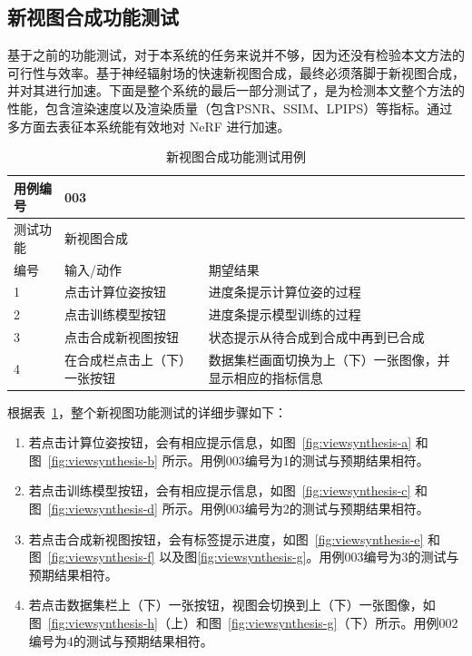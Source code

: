 \subsection{新视图合成功能测试}
基于之前的功能测试，对于本系统的任务来说并不够，因为还没有检验本文方法的可行性与效率。基于神经辐射场的快速新视图合成，最终必须落脚于新视图合成，并对其进行加速。下面是整个系统的最后一部分测试了，是为检测本文整个方法的性能，包含渲染速度以及渲染质量（包含PSNR、SSIM、LPIPS）等指标。通过多方面去表征本系统能有效地对 NeRF 进行加速。
\begin{table}[htbp]
  \centering
  \small{}\setlength{}
  \caption{新视图合成功能测试用例}
  \begin{tabular}{|p{2cm}<{\centering}|p{4cm}<{\centering}|p{4cm}<{\centering}|}
    \hline
    用例编号 & \multicolumn{2}{|l|}{003}       \\
    \hline
    测试功能 & \multicolumn{2}{|l|}{新视图合成}       \\
    \hline
    编号 & 输入/动作 & 期望结果 \\
    \hline
    1 & 点击计算位姿按钮 &  进度条提示计算位姿的过程 \\
    \hline
    2 & 点击训练模型按钮 &  进度条提示模型训练的过程 \\
    \hline
    3 & 点击合成新视图按钮 & 状态提示从待合成到合成中再到已合成 \\
    \hline
    4 & 在合成栏点击上（下）一张按钮 & 数据集栏画面切换为上（下）一张图像，并显示相应的指标信息 \\
    \hline
  \end{tabular}
  \label{tab:viewsynthesis}
\end{table}
根据表~\ref{tab:viewsynthesis}，整个新视图功能测试的详细步骤如下：
\begin{enumerate}
    \item[1)] 若点击计算位姿按钮，会有相应提示信息，如图~\ref{fig:viewsynthesis-a} 和图~\ref{fig:viewsynthesis-b} 所示。用例003编号为1的测试与预期结果相符。
    \item[2)] 若点击训练模型按钮，会有相应提示信息，如图~\ref{fig:viewsynthesis-c} 和图~\ref{fig:viewsynthesis-d} 所示。用例003编号为2的测试与预期结果相符。
    \item[3)] 若点击合成新视图按钮，会有标签提示进度，如图~\ref{fig:viewsynthesis-e} 和图~\ref{fig:viewsynthesis-f} 以及图\ref{fig:viewsynthesis-g}。用例003编号为3的测试与预期结果相符。
    \item[4)] 若点击数据集栏上（下）一张按钮，视图会切换到上（下）一张图像，如图~\ref{fig:viewsynthesis-h}（上）和图~\ref{fig:viewsynthesis-g}（下）所示。用例002编号为4的测试与预期结果相符。
\end{enumerate}
\newpage

